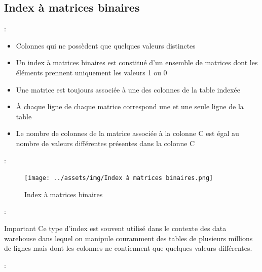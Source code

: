 \documentclass[10pt]{beamer}
\begin{document}
\subsection{Index à matrices binaires}
\begin{frame}{\secname : \subsecname}
    \begin{itemize}
        \item Colonnes qui ne possèdent que quelques valeurs distinctes
        \item Un index à matrices binaires est constitué d'un ensemble de matrices dont les éléments prennent uniquement les valeurs 1 ou 0
        \item Une matrice est toujours associée à une des colonnes de la table indexée
        \item À chaque ligne de chaque matrice correspond une et une seule ligne de la table
        \item Le nombre de colonnes de la matrice associée à la colonne C est égal au nombre de valeurs différentes présentes dans la colonne C
    \end{itemize}
\end{frame}

\begin{frame}{\secname : \subsecname}
    \begin{figure}
        \begin{center}
            \texttt{[image: ../assets/img/Index à matrices binaires.png]}
            \caption*{Index à matrices binaires}
            \label{Fig:Index à matrices binaires}
        \end{center}
    \end{figure}
\end{frame}

\begin{frame}{\secname : \subsecname}
    \begin{alertblock}{Important}
        Ce type d'index est souvent utilisé dans le contexte des data warehouse dans lequel on manipule couramment des tables de plusieurs millions de lignes mais dont les colonnes ne contiennent que quelques valeurs différentes.
    \end{alertblock}
\end{frame}


\begin{frame}{\secname : \subsecname}
    
\end{frame}
\end{document}
